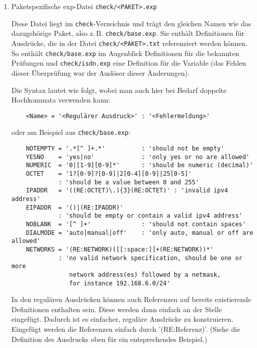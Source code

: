   \begin{enumerate}
  \item Paketspezifische exp-Datei \texttt{check/<PAKET>.exp}

    Diese Datei liegt im \texttt{check}-Verzeichnis und trägt den gleichen Namen
    wie das dazugehörige Paket, also z.\,B. \texttt{check/base.exp}. Sie enthält
    Definitionen für Ausdrücke, die in der Datei \texttt{check/<PAKET>.txt} referenziert werden
    können. So enthält \texttt{check/base.exp} im Augenblick Definitionen für die
    bekannten Prüfungen und \texttt{check/isdn.exp} eine Definition für die Variable
     (das Fehlen dieser Überprüfung war der Auslöser
    dieser Änderungen).

Die Syntax lautet wie folgt, wobei man auch hier bei Bedarf doppelte
Hochkommata verwenden kann:
\begin{example}
\begin{verbatim}
    <Name> = '<Regulärer Ausdruck>' : '<Fehlermeldung>'
\end{verbatim}
\end{example}
oder am Beispiel aus \texttt{check/base.exp}:
\begin{example}
\begin{verbatim}
    NOTEMPTY = '.*[^ ]+.*'          : 'should not be empty'
    YESNO    = 'yes|no'             : 'only yes or no are allowed'
    NUMERIC  = '0|[1-9][0-9]*'      : 'should be numeric (decimal)'
    OCTET    = '1?[0-9]?[0-9]|2[0-4][0-9]|25[0-5]'
             : 'should be a value between 0 and 255'
    IPADDR   = '((RE:OCTET)\.){3}(RE:OCTET)' : 'invalid ipv4 address'
    EIPADDR  = '()|(RE:IPADDR)'
             : 'should be empty or contain a valid ipv4 address'
    NOBLANK  = '[^ ]+'              : 'should not contain spaces'
    DIALMODE = 'auto|manual|off'    : 'only auto, manual or off are allowed'
    NETWORKS = '(RE:NETWORK)([[:space:]]+(RE:NETWORK))*'
             : 'no valid network specification, should be one or more
                network address(es) followed by a netmask,
                for instance 192.168.6.0/24'
\end{verbatim}
\end{example}

In den regulären Ausdrücken können auch Referenzen auf bereits
existierende Definitionen enthalten sein. Diese werden dann einfach an
der Stelle eingefügt. Dadurch ist es einfacher, reguläre Ausdrücke zu
konstruieren. Eingefügt werden die Referenzen einfach durch
'(RE:Referenz)'. (Siehe die Definition des Ausdrucks  oben für
ein entsprechendes Beispiel.)


\end{enumerate}
